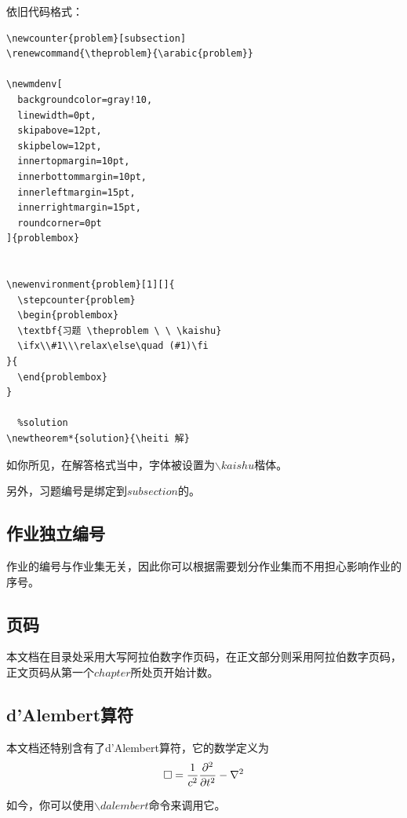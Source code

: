 \documentclass{template}
\begin{document}
\begin{solution}
    依旧代码格式：
    \begin{lstlisting}[title=\ ,frame=single]
  %problem
\newcounter{problem}[subsection]
\renewcommand{\theproblem}{\arabic{problem}}

\newmdenv[
  backgroundcolor=gray!10, 
  linewidth=0pt,
  skipabove=12pt,
  skipbelow=12pt, 
  innertopmargin=10pt,
  innerbottommargin=10pt,
  innerleftmargin=15pt,
  innerrightmargin=15pt,
  roundcorner=0pt
]{problembox} 


\newenvironment{problem}[1][]{
  \stepcounter{problem}
  \begin{problembox}
  \textbf{习题 \theproblem \ \ \kaishu}
  \ifx\\#1\\\relax\else\quad (#1)\fi
}{
  \end{problembox}
}

  %solution
\newtheorem*{solution}{\heiti 解}
    \end{lstlisting}
\end{solution}

如你所见，在解答格式当中，字体被设置为$\backslash kaishu$楷体。

另外，习题编号是绑定到$subsection$的。
\subsection{作业独立编号}
作业的编号与作业集无关，因此你可以根据需要划分作业集而不用担心影响作业的序号。
\subsection{页码}
本文档在目录处采用大写阿拉伯数字作页码，在正文部分则采用阿拉伯数字页码，正文页码从第一个$chapter$所处页开始计数。
\subsection{d'Alembert算符}
本文档还特别含有了d'Alembert算符，它的数学定义为
\[\mathop{}\!\square=\frac{1}{c^2}\frac{\partial^2}{\partial t^2}-\nabla^2\]

如今，你可以使用$\backslash dalembert$命令来调用它。
\end{document}
